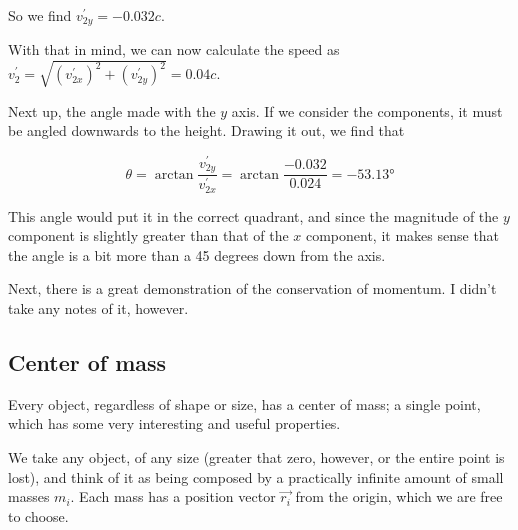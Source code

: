 So we find $v_{2y}^{'} = -0.032c$.

With that in mind, we can now calculate the speed as $v_2^{'} = \sqrt{(v_{2x}^{'})^2 + (v_{2y}^{'})^2} = 0.04c$.

Next up, the angle made with the $y$ axis. If we consider the components, it must be angled downwards to the height. Drawing it out, we find that

\begin{equation}
\theta = \arctan \frac{v_{2y}^{'}}{v_{2x}^{'}} = \arctan \frac{-0.032}{0.024} = \ang{-53.13}
\end{equation}

This angle would put it in the correct quadrant, and since the magnitude of the $y$ component is slightly greater than that of the $x$ component, it makes sense that the angle is a bit more than a 45 degrees down from the axis.

Next, there is a great demonstration of the conservation of momentum. I didn't take any notes of it, however.

\subsection{Center of mass}

Every object, regardless of shape or size, has a center of mass; a single point, which has some very interesting and useful properties.

We take any object, of any size (greater that zero, however, or the entire point is lost), and think of it as being composed by a practically infinite amount of small masses $m_i$. Each mass has a position vector $\vec{r_i}$ from the origin, which we are free to choose.

\begin{figure}[H]
  \centering
{}
\end{figure}


